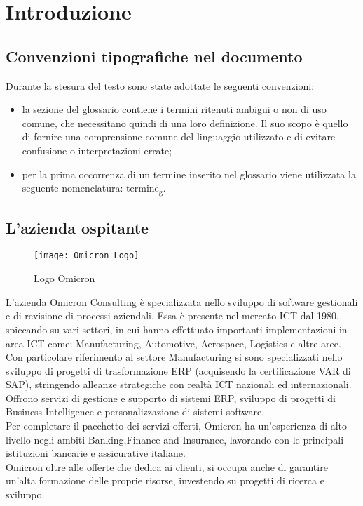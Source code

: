 \chapter{Introduzione}
\label{cap:introduzione}
\section{Convenzioni tipografiche nel documento}
Durante la stesura del testo sono state adottate le seguenti convenzioni:
\begin{itemize}
\item la sezione del glossario contiene i termini ritenuti ambigui o non di uso comune, che necessitano quindi di una loro definizione. Il suo scopo è quello di fornire una comprensione comune del linguaggio utilizzato e di evitare confusione o interpretazioni errate;
\item per la prima occorrenza di un termine inserito nel glossario viene utilizzata la seguente nomenclatura: termine\textsubscript{g}.\\
\end{itemize}

\section{L'azienda ospitante}

\begin{figure}[!h] 
    \centering 
    \texttt{[image: Omicron\_Logo]} 
    \caption{Logo Omicron}
\end{figure}

\noindent L’azienda Omicron Consulting è specializzata nello sviluppo di software gestionali e di revisione di processi aziendali. Essa è presente nel mercato ICT dal 1980, spiccando su vari settori, in cui hanno effettuato importanti implementazioni in area ICT come: Manufacturing, Automotive, Aerospace, Logistics e altre aree.
Con particolare riferimento al settore Manufacturing si sono specializzati nello sviluppo di progetti di trasformazione ERP (acquisendo la certificazione VAR di SAP), stringendo alleanze strategiche con realtà ICT nazionali ed internazionali.\\
Offrono servizi di gestione e supporto di sistemi ERP, sviluppo di progetti di Business Intelligence e personalizzazione di sistemi software.\\
Per completare il pacchetto dei servizi offerti, Omicron ha un'esperienza di alto livello negli ambiti Banking,Finance and Insurance, lavorando con le principali istituzioni bancarie e assicurative italiane.\\
Omicron oltre alle offerte che dedica ai clienti, si occupa anche di garantire un'alta formazione delle proprie risorse, investendo su progetti di ricerca e sviluppo.

